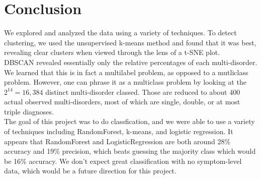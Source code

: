 \documentclass[11pt]{amsart}
\begin{document}
\section{Conclusion}

We explored and analyzed the data using a variety of techniques. To detect clustering, we used the unsupervised k-means method and found that it was best, revealing clear clusters when viewed through the lens of a t-SNE plot. \\

DBSCAN revealed essentially only the relative percentages of each multi-disorder. We learned that this is in fact a multilabel problem, as opposed to a mutliclass problem. However, one can phrase it as a multiclass problem by looking at the $2^14=16,384$ distinct multi-disorder classed. Those are reduced to about 400 actual observed multi-disorders, most of which are single, double, or at most triple diagnoses.  \\

The goal of this project was to do classfication, and we were able to use a variety of techniques including RandomForest, k-means, and logistic regression. It appears that RandomForest and LogisticRegression are both around 28\% accuracy and 19\% precision, which beats guessing the majority class which would be 16\% accuracy. We don't expect great classification with no symptom-level data, which would be a future direction for this project.
\end{document}
